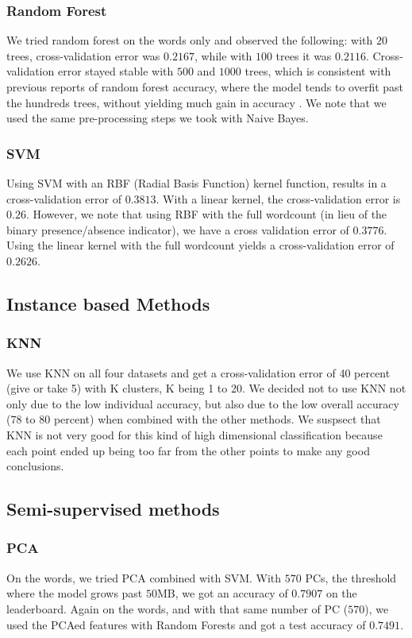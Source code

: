 \documentclass[11pt,twocolumn]{report}
\begin{document}
     \subsubsection{Random Forest}
     We tried random forest on the words only and observed the following: with $20$ trees, cross-validation error was $0.2167$, while with $100$ trees it was $0.2116$. Cross-validation error stayed stable with $500$ and $1000$ trees, which is consistent with previous reports of random forest accuracy, where the model tends to overfit past the hundreds trees, without yielding much gain in accuracy \cite{latinne2001limiting,oshiro2012many}. We note that we used the same pre-processing steps we took with Naive Bayes.

    \subsubsection{SVM}
    Using SVM with an RBF (Radial Basis Function) kernel function, results in a cross-validation error of $0.3813$. With a linear kernel, the cross-validation error is $0.26$. However, we note that using RBF with the full wordcount (in lieu of the binary presence/absence indicator), we have a cross validation error of $0.3776$. Using the linear kernel with the full wordcount yields a cross-validation error of $0.2626$.
    
    \subsection*{Instance based Methods}
    \subsubsection{KNN}
    
    We use KNN on all four datasets and get a cross-validation error of 40 percent (give or take 5) with K clusters, K being 1 to 20. We decided not to use KNN not only due to the low individual accuracy, but also due to the low overall accuracy (78 to 80 percent) when combined with the other methods. We suspsect that KNN is not very good for this kind of high dimensional classification because each point ended up being too far from the other points to make any good conclusions. 
   
    \subsection*{Semi-supervised methods}
    \subsubsection*{PCA}
    On the words, we tried PCA combined with SVM. With $570$ PCs, the threshold where the model grows past $50$MB, we got an accuracy of $0.7907$ on the leaderboard. Again on the words, and with that same number of PC ($570$), we used the PCAed features with Random Forests and got a test accuracy of $0.7491$.
\end{document}
